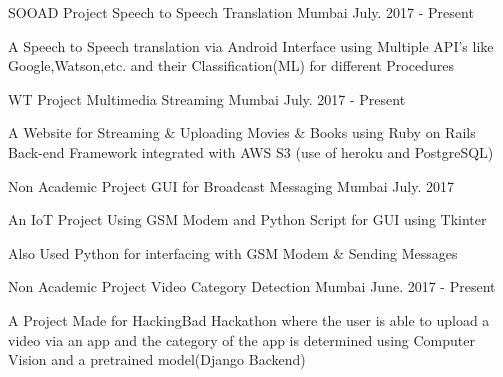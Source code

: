 

\begin{cventries}

  \cventry
    {SOOAD Project} %
    {Speech to Speech Translation} %
    {Mumbai} %
    {July. 2017 - Present} %
    {
      \begin{cvitems} %
        \item {A Speech to Speech translation via Android Interface using Multiple API's like Google,Watson,etc. and their Classification(ML) for different    Procedures}
      \end{cvitems}
    }
  \cventry
    {WT Project} %
    {Multimedia Streaming} %
    {Mumbai} %
    {July. 2017 - Present} %
    {
      \begin{cvitems} %
        \item {A Website for Streaming \& Uploading Movies \& Books using Ruby on Rails Back-end Framework integrated with AWS S3 (use of heroku and PostgreSQL)}
      \end{cvitems}
    }
  \cventry
    {Non Academic Project} %
    {GUI for Broadcast Messaging} %
    {Mumbai} %
    {July. 2017} %
    {
      \begin{cvitems} %
        \item {An IoT Project Using GSM Modem and Python Script for GUI using Tkinter}
	\item {Also Used Python for interfacing with GSM Modem \& Sending Messages}
      \end{cvitems}
    }
  \cventry
    {Non Academic Project} %
    {Video Category Detection} %
    {Mumbai} %
    {June. 2017 - Present} %
    {
      \begin{cvitems} %
        \item {A Project Made for HackingBad Hackathon where the user is able to upload a video via an app and the category of the app is determined using Computer Vision and a pretrained model(Django Backend)}

\end{cvitems}}
\end{cventries}
